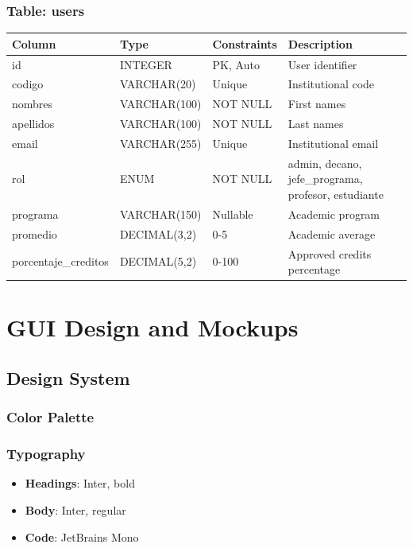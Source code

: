 \documentclass[12pt,a4paper]{report}
\begin{document}
\subsection{Table: users}
\begin{longtable}{|p{3cm}|p{2.5cm}|p{2cm}|p{6cm}|}
\hline
\textbf{Column} & \textbf{Type} & \textbf{Constraints} & \textbf{Description} \\
\hline
\endfirsthead
id & INTEGER & PK, Auto & User identifier \\
\hline
codigo & VARCHAR(20) & Unique & Institutional code \\
\hline
nombres & VARCHAR(100) & NOT NULL & First names \\
\hline
apellidos & VARCHAR(100) & NOT NULL & Last names \\
\hline
email & VARCHAR(255) & Unique & Institutional email \\
\hline
rol & ENUM & NOT NULL & admin, decano, jefe\_programa, profesor, estudiante \\
\hline
programa & VARCHAR(150) & Nullable & Academic program \\
\hline
promedio & DECIMAL(3,2) & 0-5 & Academic average \\
\hline
porcentaje\_creditos & DECIMAL(5,2) & 0-100 & Approved credits percentage \\
\hline
\end{longtable}

\chapter{GUI Design and Mockups}

\section{Design System}

\subsection{Color Palette}

\subsection{Typography}
\begin{itemize}
    \item \textbf{Headings}: Inter, bold
    \item \textbf{Body}: Inter, regular
    \item \textbf{Code}: JetBrains Mono
\end{itemize}
\end{document}
